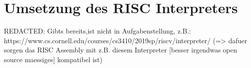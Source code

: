 \chapter{Umsetzung des RISC Interpreters}
\label{chapter}

REDACTED: Gibts bereits,ist nicht in Aufgabenstellung, z.B.: https://www.cs.cornell.edu/courses/cs3410/2019sp/riscv/interpreter/ (=> dafuer sorgen das RISC Assembly mit z.B. diesem Interpreter [besser irgendwas open source maessiges] kompatibel ist)
